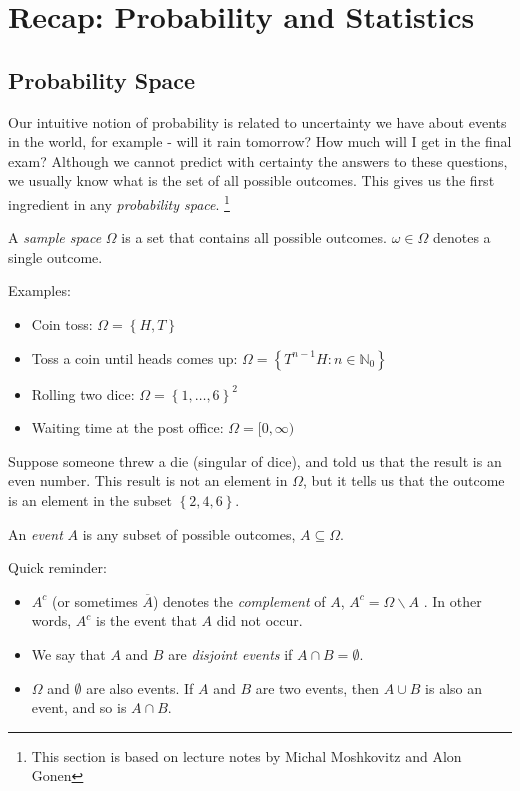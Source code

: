 \section{Recap: Probability and Statistics}
\subsection{Probability Space} 
Our intuitive notion of probability is related to uncertainty we have about events in the world, for example - will it rain tomorrow? How much will I get in the final exam? Although we cannot predict with certainty the answers to these questions, we usually know what is the set of all possible outcomes. This gives us the first ingredient in any \emph{probability space}.
\footnote{This section is based on lecture notes by Michal Moshkovitz and Alon Gonen}
\begin{definition}
A \emph{sample space} $\Omega$ is a set that contains all possible outcomes. $\omega\in\Omega$ denotes a single outcome.
\end{definition}
Examples:
\begin{itemize}
\item Coin toss: $\Omega=\left\{ H,T\right\} $
\item Toss a coin until heads comes up: $\Omega=\left\{ T^{n-1}H:n\in\mathbb{N}_0\right\} $
\item Rolling two dice: $\Omega=\left\{ 1,\dots,6\right\} ^{2}$
\item Waiting time at the post office: $\Omega=[0,\infty)$
\end{itemize}
Suppose someone threw a die (singular of dice), and told us that the result is an even number. This result is not an element in $\Omega$, but it tells us that the outcome is an element in the subset $\left\{ 2,4,6\right\} $.
\begin{definition}
An \emph{event} $A$ is any subset of possible outcomes, $A\subseteq\Omega$.
\end{definition}
Quick reminder:
\begin{itemize}
\item $A^{c}$ (or sometimes $\overline{A}$) denotes the \textit{complement} of $A$, $A^{c}=\Omega\backslash A$ . In other words, $A^{c}$ is the event that $A$ did not occur.
\item We say that $A$ and $B$ are \textit{disjoint events} if $A\cap B=\emptyset$.
\item $\Omega$ and $\emptyset$ are also events. If $A$ and $B$ are two events, then $A\cup B$ is also an event, and so is $A\cap B$.
\end{itemize}

